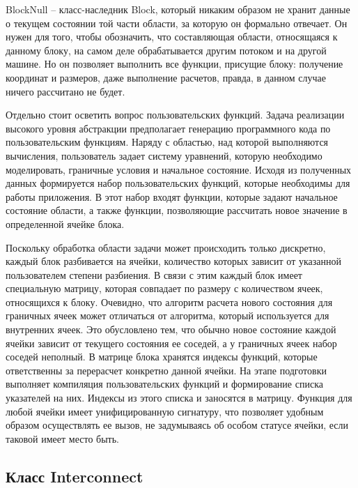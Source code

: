 \documentclass[a4paper, 14pt]{extarticle}
\theoremstyle{definition}
\begin{document}
\par BlockNull -- класс-наследник Block, который никаким образом не хранит данные о текущем состоянии той части области, за которую он формально отвечает. Он нужен для того, чтобы обозначить, что составляющая области, относящаяся к данному блоку, на самом деле обрабатывается другим потоком и на другой машине. Но он позволяет выполнить все функции, присущие блоку: получение координат и размеров, даже выполнение расчетов, правда, в данном случае ничего рассчитано не будет.

\par Отдельно стоит осветить вопрос пользовательских функций. Задача реализации высокого уровня абстракции предполагает генерацию программного кода по пользовательским функциям. Наряду с областью, над которой выполняются вычисления, пользователь задает систему уравнений, которую необходимо моделировать, граничные условия и начальное состояние. Исходя из полученных данных формируется набор пользовательских функций, которые необходимы для работы приложения. В этот набор входят функции, которые задают начальное состояние области, а также функции, позволяющие рассчитать новое значение в определенной ячейке блока.

\par Поскольку обработка области задачи может происходить только дискретно, каждый блок разбивается на ячейки, количество которых зависит от указанной пользователем степени разбиения. В связи с этим каждый блок имеет специальную матрицу, которая совпадает по размеру с количеством ячеек, относящихся к блоку. Очевидно, что алгоритм расчета нового состояния для граничных ячеек может отличаться от алгоритма, который используется для внутренних ячеек. Это обусловлено тем, что обычно новое состояние каждой ячейки зависит от текущего состояния ее соседей, а у граничных ячеек набор соседей неполный. В матрице блока хранятся индексы функций, которые ответственны за перерасчет конкретно данной ячейки. На этапе подготовки выполняет компиляция пользовательских функций и формирование списка указателей на них. Индексы из этого списка и заносятся в матрицу. Функция для любой ячейки имеет унифицированную сигнатуру, что позволяет удобным образом осуществлять ее вызов, не задумываясь об особом статусе ячейки, если таковой имеет место быть.



\subsection{Класс Interconnect}
\end{document}
